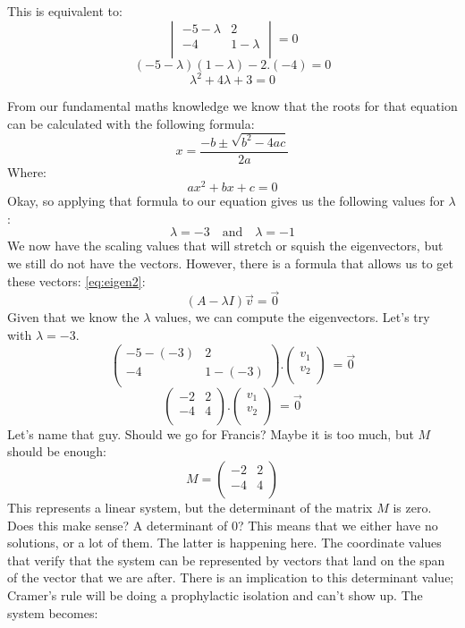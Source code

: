 \documentclass[600paper, 11pt,twoside,openany]{kdp}
\begin{document}
\par 
\vspace{-3pt}
\indent This is equivalent to:
\[\begin{vmatrix}
-5-\lambda & 2  \\
-4 & 1-\lambda \\
\end{vmatrix}  = 0 \]
\[(-5 -\lambda)(1-\lambda) -2.(-4) = 0 \]
\[\lambda^2 + 4\lambda + 3 = 0 \]
\par 
\vspace{-3pt}
\indent From our fundamental maths knowledge we know that the roots for that equation can be calculated with the following formula:
\[  x=\frac{-b \pm \sqrt{b^2-4ac}}{2a} \]
\indent Where:
\[ax^2 + bx + c = 0 \]
\indent Okay, so applying that formula to our equation gives us the following values for $\lambda$:
\[\lambda = -3 \quad \textrm{and} \quad \lambda = -1\]
\indent We now have the scaling values that will stretch or squish the eigenvectors, but we still do not have the vectors. However, there is a formula that allows us to get these vectors: \ref{eq:eigen2}:
\[(A - \lambda I)\overrightarrow{v} = \overrightarrow{0} \]
\indent Given that we know the $\lambda$ values, we can compute the eigenvectors. Let’s try with $\lambda = −3$.
\[\begin{pmatrix}
-5-(-3) & 2  \\
-4 & 1-(-3) \\
\end{pmatrix} .\begin{pmatrix}
 v_1\\
v_2\\
\end{pmatrix} \ = \overrightarrow{0} \]
\[\begin{pmatrix}
-2 & 2  \\
-4 & 4 \\
\end{pmatrix} .\begin{pmatrix}
 v_1\\
v_2\\
\end{pmatrix} \ = \overrightarrow{0} \]
\indent 
Let's name that guy. Should we go for Francis? Maybe it is too much, but $M$ should be enough:
\[M = \begin{pmatrix}
-2 & 2  \\
-4 & 4 \\
\end{pmatrix}\]
\indent This represents a linear system, but the determinant of the matrix $M$ is zero. Does this make sense? A determinant of 0? This means that we either have no solutions, or a lot of them. The latter is happening here. The coordinate values that verify that the system can be represented by vectors that land on the span of the vector that we are after. There is an implication to this determinant value; Cramer’s rule will be doing a prophylactic isolation and can’t show up. The system becomes:
\end{document}
